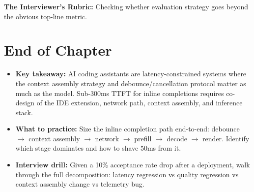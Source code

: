 \textbf{The Interviewer's Rubric:} Checking whether evaluation strategy goes beyond the obvious top-line metric.

\section*{End of Chapter}

\begin{itemize}
  \item \textbf{Key takeaway:} AI coding assistants are latency-constrained systems where the context assembly strategy and debounce/cancellation protocol matter as much as the model. Sub-300ms TTFT for inline completions requires co-design of the IDE extension, network path, context assembly, and inference stack.
  \item \textbf{What to practice:} Size the inline completion path end-to-end: debounce $\rightarrow$ context assembly $\rightarrow$ network $\rightarrow$ prefill $\rightarrow$ decode $\rightarrow$ render. Identify which stage dominates and how to shave 50ms from it.
  \item \textbf{Interview drill:} Given a 10\% acceptance rate drop after a deployment, walk through the full decomposition: latency regression vs quality regression vs context assembly change vs telemetry bug.
\end{itemize}
